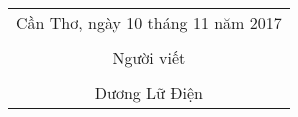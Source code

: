 \documentclass[./thesis.tex]{subfiles}
\begin{document}
\hspace*{\fill}
\begin{tabular}{@{}c@{}} 
Cần Thơ, ngày 10 tháng 11 năm 2017\\ \\
Người viết\\ \\
Dương Lữ Điện
\end{tabular}
\end{document}

